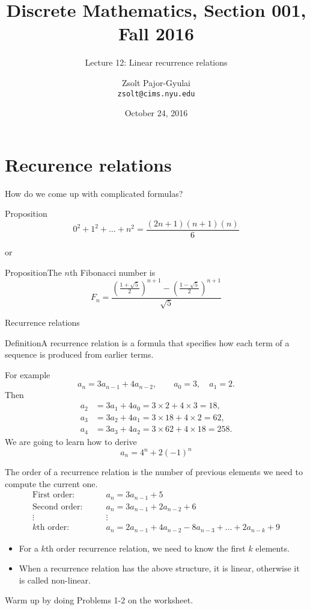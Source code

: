 \documentclass{beamer}
\title{Discrete Mathematics, Section 001, Fall 2016}
\subtitle{Lecture 12: Linear recurrence relations}
\date{October 24, 2016}
\author[Zsolt]{Zsolt Pajor-Gyulai \\ \texttt{zsolt@cims.nyu.edu}}
\institute[NYU] 
{
\normalsize Courant Institute of Mathematical Sciences
}
\def\bl[#1]#2{\begin{block}{#1}#2\end{block}}
\def\itemb{\begin{itemize}}
\def\iteme{\end{itemize}}
\begin{document}
\begin{frame}
  \titlepage
\end{frame}



\section{Recurence relations}

\begin{frame}{How do we come up with complicated formulas?}
\bl[Proposition]{
\[
0^2+1^2+\dots+n^2=\frac{(2n+1)(n+1)(n)}{6}
\]
}
or
\bl[Proposition]{The $n$th Fibonacci number is
\[
F_n=\frac{\left(\frac{1+\sqrt{5}}{2}\right)^{n+1}-\left(\frac{1-\sqrt{5}}{2}\right)^{n+1}}{\sqrt{5}}
\]
}
\end{frame}

\begin{frame}{Recurrence relations}
\bl[Definition]{A recurrence relation is a formula that specifies how each term of a sequence is produced from earlier terms.
}
For example 
\[
a_n=3a_{n-1}+4a_{n-2},\qquad a_0=3,\quad a_1=2.
\]
Then
\begin{align*}
a_2&=3a_1+4a_0=3\times 2+4\times 3=18,\\
a_3&=3a_2+4a_1=3\times 18+4\times 2=62,\\
a_4&=3a_3+4a_2=3\times 62+4\times 18=258.
\end{align*}
We are going to learn how to derive
\[
a_n=4^n+2(-1)^n
\]
\end{frame}

\begin{frame}
The order of a recurrence relation is the number of previous elements we need to compute the current one.
\begin{align*}
\textrm{First order:}&\qquad a_n=3a_{n-1}+5\\
\textrm{Second order:}&\qquad a_n=3a_{n-1}+2a_{n-2}+6\\
\vdots&\qquad\vdots\\
\textrm{$k$th order:}& \qquad a_n=2a_{n-1}+4a_{n-2}-8a_{n-3}+\dots+2a_{n-k}+9 
\end{align*}
\itemb
\item For a $k$th order recurrence relation, we need to know the first $k$ elements.
\item When a recurrence relation has the above structure, it is linear, otherwise it is called non-linear.
\iteme
\center Warm up by doing Problems 1-2 on the worksheet.
\end{frame}
\end{document}
